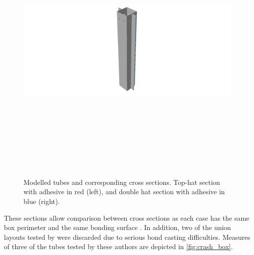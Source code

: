 \documentclass[cmfonts]{witpress}
\begin{document}
\begin{figure}
\begin{minipage}[b]{.4\linewidth}
\end{minipage}
\hfill
\begin{minipage}[b]{.4\linewidth}
	\centering
	\includegraphics[height=135mm]{figures/IMG_CUTRES/B_tube}
\end{minipage}

	\caption[Modelled tubes and corresponding cross sections.]{Modelled tubes and corresponding cross sections. Top-hat section with adhesive in red (left), and double hat section with adhesive in blue (right).}
	\label{fig:tubes}
\end{figure}

These sections allow comparison between cross sections as each case has the same box perimeter and the same bonding surface \cite{Peroni2009}. In addition, two of the union layouts tested by \cite{Peroni2009} were discarded due to serious bond casting difficulties. Measures of three of the tubes tested by these authors are depicted in \cref{fig:crash_box}.
\end{document}
